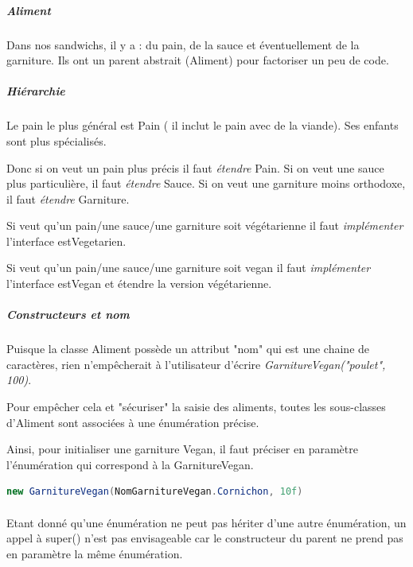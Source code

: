 \documentclass[a4paper]{article}
\begin{document}
\paragraph{}
\subparagraph{Aliment}
Dans nos sandwichs, il y a : du pain, de la sauce et éventuellement de la garniture. Ils ont un parent abstrait (Aliment) pour factoriser un peu de code.

\subparagraph*{Hiérarchie}
Le pain le plus général est Pain ( il inclut le pain avec de la viande). Ses enfants sont plus spécialisés.

Donc si on veut un pain plus précis il faut \emph{étendre} Pain. Si on veut une sauce plus particulière, il faut \emph{étendre} Sauce. Si on veut une garniture moins orthodoxe, il faut \emph{étendre} Garniture.

Si veut qu'un pain/une sauce/une garniture soit végétarienne il faut \emph{implémenter} l'interface estVegetarien.

Si veut qu'un pain/une sauce/une garniture soit vegan il faut \emph{implémenter} l'interface estVegan et étendre la version végétarienne.

\subparagraph*{Constructeurs et nom}

\paragraph{} Puisque la classe Aliment possède un attribut "nom" qui est une chaine de caractères, rien n'empêcherait à l'utilisateur d'écrire \emph{GarnitureVegan("poulet", 100)}.

Pour empêcher cela et "sécuriser" la saisie des aliments, toutes les sous-classes d'Aliment sont associées à une énumération précise.

Ainsi, pour initialiser une garniture Vegan, il faut préciser en paramètre l'énumération qui correspond à la GarnitureVegan.

\begin{lstlisting}[language=Java, caption=Initialisation GarnitureVegan]
    new GarnitureVegan(NomGarnitureVegan.Cornichon, 10f)
\end{lstlisting}

\paragraph{} Etant donné qu'une énumération ne peut pas hériter d'une autre énumération, un appel à super() n'est pas envisageable car le constructeur du parent ne prend pas en paramètre la même énumération.
\end{document}
